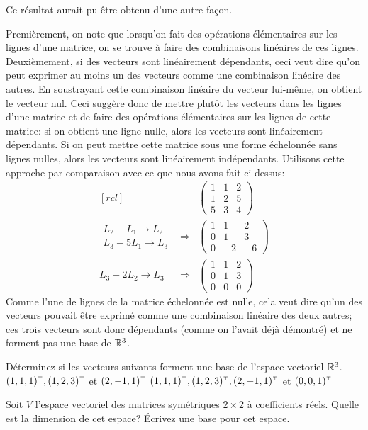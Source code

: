\begin{exemple}
Ce résultat aurait pu être obtenu d'une autre façon. 


Premièrement, on note que
lorsqu'on fait des opérations élémentaires sur les
lignes d'une matrice, on se trouve à faire des combinaisons
linéaires de ces lignes.   Deuxièmement, si des vecteurs
sont linéairement dépendants, ceci veut dire qu'on peut
exprimer au moins un des vecteurs comme une combinaison
linéaire des autres.  En soustrayant cette combinaison
linéaire du vecteur lui-même, on obtient le vecteur nul.
Ceci suggère donc de mettre plutôt les vecteurs
dans les lignes d'une matrice et de faire des opérations
élémentaires sur les lignes de cette matrice: si on
obtient une ligne nulle, alors les vecteurs sont linéairement dépendants.
Si on peut mettre cette matrice sous une forme échelonnée
sans lignes nulles, alors les vecteurs sont linéairement
indépendants.  Utilisons cette approche par comparaison
avec ce que nous avons fait ci-dessus:
\[
\begin{matrix}[rcl]
&& \begin{pmatrix}
1 & 1 & 2 \\
1 & 2 & 5 \\
5 & 3 & 4
\end{pmatrix} \\[25pt]
\begin{matrix}
L_2 - L_1 \rightarrow L_2 \\
L_3 -5L_1 \rightarrow L_3
\end{matrix}
&\Rightarrow&
\begin{pmatrix}
1 & 1 & 2 \\
0 & 1 & 3 \\
0 & -2 & -6
\end{pmatrix} \\[25pt]
L_3 + 2L_2 \rightarrow L_3
&\Rightarrow&
\begin{pmatrix}
1 & 1 & 2 \\
0 & 1 & 3 \\
0 & 0 & 0
\end{pmatrix}
\end{matrix}
\]
Comme l'une de lignes de la matrice échelonnée est nulle, cela veut dire qu'un des vecteurs pouvait être exprimé
comme une combinaison linéaire des deux autres; ces trois vecteurs sont donc dépendants (comme on l'avait déjà démontré)
et ne forment pas une base de $\mathbb{R}^3$.
\end{exemple}
\begin{exerciceC}
Déterminez si les vecteurs suivants forment une base de l'espace vectoriel $\mathbb{R}^3$.
 $\transp{(1, 1, 1)}, \transp{(1, 2, 3)}$ et $\transp{(2, -1, 1)}$
 $\transp{(1, 1, 1)}, \transp{(1, 2, 3)}, \transp{(2, -1, 1)}$ et $\transp{(0, 0, 1)}$
\end{exerciceC}
\begin{exerciceC}
Soit $V$ l'espace vectoriel des matrices symétriques $2\times2$ à coefficients réels.
Quelle est la dimension de cet espace?  Écrivez une base pour cet espace.
\end{exerciceC}

